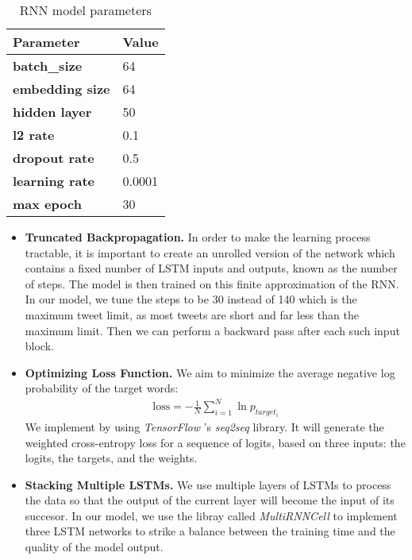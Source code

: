 \begin{table}[htpb]
\centering
\caption{RNN model parameters}
\label{table:rnn}
\begin{tabular}{|l|l|}
\hline
\textbf{Parameter}      & \textbf{Value} \\ \hline
\textbf{batch\_size}    & 64             \\ \hline
\textbf{embedding size} & 64             \\ \hline
\textbf{hidden layer}   & 50             \\ \hline
\textbf{l2 rate}   & 0.1            \\ \hline 
\textbf{dropout rate}   & 0.5            \\ \hline
\textbf{learning rate}  & 0.0001         \\ \hline
\textbf{max epoch}     & 30             \\ \hline
\end{tabular}
\end{table}

\begin{itemize}
\item \textbf{Truncated Backpropagation.} In order to make the learning process tractable, it is important to create an unrolled version of the network which contains a fixed number of LSTM inputs and outputs, known as the number of steps. The model is then trained on this finite approximation of the RNN. 
%
In our model, we tune the steps to be 30 instead of 140 which is the maximum tweet limit, as most tweets are short and far less than the maximum limit.
%
Then we can perform a backward pass after each such input block.

\item \textbf{Optimizing Loss Function.} We aim to minimize the average negative log probability of the target words: 
\begin{align*}
\text{loss} = -\frac{1}{N} \sum_{i=1}^{N} \ln p_{target_i}
\end{align*}
We implement by using \emph{TensorFlow} 's \emph{seq2seq} library. It will generate the weighted cross-entropy loss for a sequence of logits, based on three inputs: the logits, the targets, and the weights. 

 
\item \textbf{Stacking Multiple LSTMs.} We use multiple layers of LSTMs to process the data so that the output of the current layer will become the input of its succesor.
%
In our model,  we use the libray called \emph{MultiRNNCell} to implement three LSTM networks to strike a balance between the training time and the quality of the model output.
\end{itemize}
 

